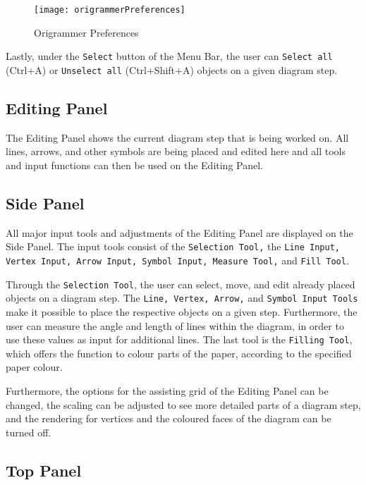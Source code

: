 \begin{figure}[htbp]
	\centering
	\texttt{[image: origrammerPreferences]}
	\caption{Origrammer Preferences}
	\label{fig:origrammerPreferences}
\end{figure}

Lastly, under the \texttt{Select} button of the Menu Bar, the user can \texttt{Select all} (Ctrl+A) or \texttt{Unselect all} (Ctrl+Shift+A) objects on a given diagram step.

\newpage
\subsection{Editing Panel}
\label{sec:editingPanel}

The Editing Panel shows the current diagram step that is being worked on. All lines, arrows, and other symbols are being placed and edited here and all tools and input functions can then be used on the Editing Panel.

\subsection{Side Panel}
\label{sec:sidePanel}

All major input tools and adjustments of the Editing Panel are displayed on the Side Panel. The input tools consist of the \texttt{Selection Tool,} the \texttt{Line Input, Vertex Input, Arrow Input, Symbol Input, Measure Tool,} and \texttt{Fill Tool}.

Through the \texttt{Selection Tool}, the user can select, move, and edit already placed objects on a diagram step. The \texttt{Line, Vertex, Arrow,} and \texttt{Symbol Input Tools} make it possible to place the respective objects on a given step. Furthermore, the user can measure the angle and length of lines within the diagram, in order to use these values as input for additional lines. The last tool is the \texttt{Filling Tool}, which offers the function to colour parts of the paper, according to the specified paper colour.

Furthermore, the options for the assisting grid of the Editing Panel can be changed, the scaling can be adjusted to see more detailed parts of a diagram step, and the rendering for vertices and the coloured faces of the diagram can be turned off.

\subsection{Top Panel}
\label{sec:topPanel}

